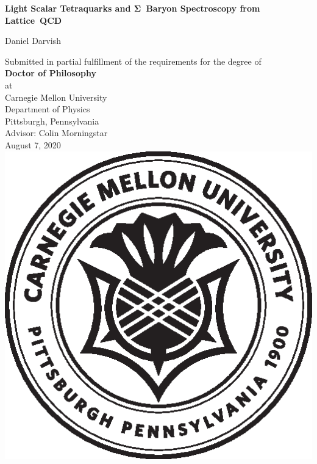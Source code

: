 \begin{titlepage}
    \begin{center}
        
        \linespread{1.0}\huge \textbf{Light Scalar Tetraquarks and \mbox{$\mathbf{\Sigma}$ Baryon} Spectroscopy from \mbox{Lattice QCD}}
        
        \linespread{1.3}
        
        \vfill
 
        {\Large Daniel Darvish}
        \large
        \vfill
             
        Submitted in partial fulfillment of the requirements for the degree of\\
        \vspace{0.5cm}
        \textbf{Doctor of Philosophy}\\
        \vspace{0.5cm}
        at\\
        \vspace{0.5cm}
        Carnegie Mellon University\\
        Department of Physics\\
        Pittsburgh, Pennsylvania\\
        \vspace{1cm}
        Advisor: Colin Morningstar\\
        \vspace{1cm}
        August 7, 2020
        \vfill
        \includegraphics[scale=0.6]{figures/cmu.eps}
    \end{center}
 \end{titlepage}